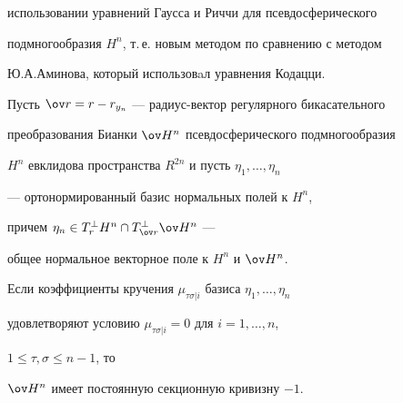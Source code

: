 использовании уравнений Гаусса и Риччи для псевдосферического


подмногообразия $H^n$, т.\,е. новым методом по сравнению с методом


Ю.А.Аминова, который использовaл уравнения Кодацци.








\begin{thmnonum}


Пусть $\ov r=r-r_{y_n}$ --- радиус-вектор регулярного бикасательного 


преобразования Бианки $\ov H{}^n$ псевдосферического подмногообразия


$H^n$ евклидова пространства $R^{2n}$ и пусть $\eta_1,\dotsc,\eta_n$


--- ортонормированный базис нормальных полей к $H^n$,


причем $\eta_n\in T^\perp_r H^n\cap T^\perp_{\ov r}\ov H{}^n$ ---


общее нормальное векторное поле к $H^n$ и $\ov H{}^n$.


Если коэффициенты кручения $\mu_{\tau\sigma|i}$ базиса $\eta_1,\dotsc,\eta_n$


удовлетворяют условию $\mu_{\tau\sigma|i}=0$ для $i=1,\dotsc,n$,


$1\le\tau,\sigma\le n-1$, то


$\ov H{}^n$ имеет постоянную секционную кривизну $-1$.


\end{thmnonum} 





